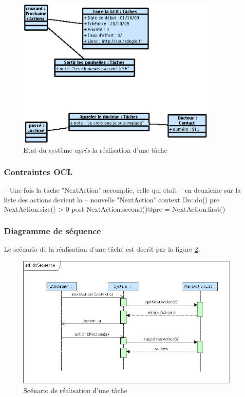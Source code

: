 \begin{figure}[!ht]
\begin{center}
\includegraphics[width=10cm]{images/Instantane_Do_2.png}
\caption{Etat du système \emph{après} la réalisation d'une tâche}
\label{do2}
\end{center}
\end{figure}

\subsubsection{Contraintes OCL}

\begin{ocl}
-- Une fois la tache "NextAction" accomplie, celle qui etait
-- en deuxieme sur la liste des actions devient la
-- nouvelle "NextAction"
context Do::do()
pre NextAction.size() > 0
post NextAction.second()@pre = NextAction.first()
\end{ocl}

\subsubsection{Diagramme de séquence}
Le scénario de la réalisation d'une tâche est décrit par la figure \ref{doSequence}.
\begin{figure}[!ht]
\begin{center}
\includegraphics[width=12cm]{images/doSequence.png}
\caption{Scénario de réalisation d'une tâche}
\label{doSequence}
\end{center}
\end{figure}


